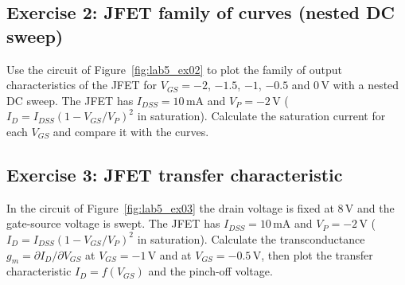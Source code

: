 

\subsection{Exercise 2: JFET family of curves (nested DC sweep)}
Use the circuit of Figure~\ref{fig:lab5_ex02} to plot the family of output characteristics of the JFET for $V_{GS}=-2$, $-1.5$, $-1$, $-0.5$ and 0\,V with a nested DC sweep. The JFET has $I_{DSS}=10$\,mA and $V_P=-2$\,V ($I_D=I_{DSS}(1-V_{GS}/V_P)^2$ in saturation). Calculate the saturation current for each $V_{GS}$ and compare it with the curves.






\subsection{Exercise 3: JFET transfer characteristic}
In the circuit of Figure~\ref{fig:lab5_ex03} the drain voltage is fixed at 8\,V and the gate-source voltage is swept. The JFET has $I_{DSS}=10$\,mA and $V_P=-2$\,V ($I_D=I_{DSS}(1-V_{GS}/V_P)^2$ in saturation). Calculate the transconductance $g_m=\partial I_D/\partial V_{GS}$ at $V_{GS}=-1$\,V and at $V_{GS}=-0.5$\,V, then plot the transfer characteristic $I_D=f(V_{GS})$ and the pinch-off voltage.

